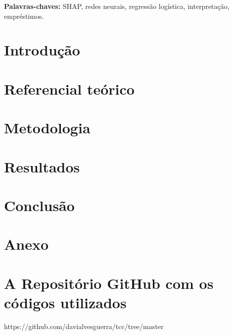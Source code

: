 \documentclass[12pt, a4paper, twoside]{article}
\numberwithin{equation}{subsection} %
\begin{document}
\begin{flushleft}
    \textbf{Palavras-chaves:} SHAP, redes neurais, regressão logística, interpretação, empréstimos.
\end{flushleft}
    

\newpage


\listoftables
\newpage


\listoffigures
\newpage


\tableofcontents
\newpage

\section{\textbf{Introdução}}

\newpage


\section{\textbf{Referencial teórico}}

\newpage

\section{\textbf{Metodologia}}

\newpage


\section{\textbf{Resultados}}

\newpage



% 

\section{\textbf{Conclusão}}

\newpage




\newpage
\section*{\textbf{Anexo}}

\section*{\textbf{A \hspace{0.8cm} Repositório GitHub com os códigos utilizados}}

https://github.com/davialvesguerra/tcc/tree/master
\end{document}
